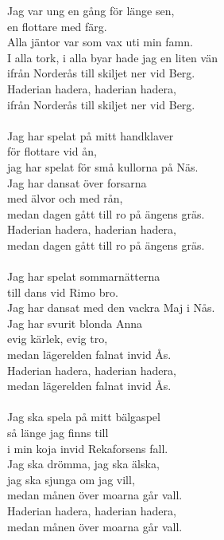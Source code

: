 \vspace{10pt}
Jag var ung en gång för länge sen,\\
en flottare med färg.\\
Alla jäntor var som vax uti min famn.\\
I alla tork, i alla byar hade jag en liten vän\\
ifrån Norderås till skiljet ner vid Berg.\\
Haderian hadera, haderian hadera,\\
ifrån Norderås till skiljet ner vid Berg.\\
\\
Jag har spelat på mitt handklaver\\
för flottare vid ån,\\
jag har spelat för små kullorna på Näs.\\
Jag har dansat över forsarna\\
med älvor och med rån,\\
medan dagen gått till ro på ängens gräs.\\
Haderian hadera, haderian hadera,\\
medan dagen gått till ro på ängens gräs.\\
\\
Jag har spelat sommarnätterna\\
till dans vid Rimo bro.\\
Jag har dansat med den vackra Maj i Nås.\\
Jag har svurit blonda Anna\\
evig kärlek, evig tro,\\
medan lägerelden falnat invid Ås.\\
Haderian hadera, haderian hadera,\\
medan lägerelden falnat invid Ås.\\
\\
Jag ska spela på mitt bälgaspel\\
så länge jag finns till\\
i min koja invid Rekaforsens fall.\\
Jag ska drömma, jag ska älska,\\
jag ska sjunga om jag vill,\\
medan månen över moarna går vall.\\
Haderian hadera, haderian hadera,\\
medan månen över moarna går vall.
